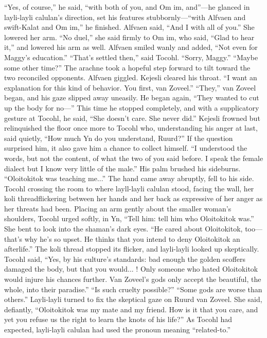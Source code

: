 \documentclass[9pt]{article}
\begin{document}
“Yes, of course,” he said, “with both of you, and Om im, and”—he glanced in layli-layli calulan’s
direction, set his features stubbornly—“with Alfvaen and swift-Kalat and Om im,” he finished.
Alfvaen said, “And I with all of you.” She lowered her arm. “No duel,” she said firmly to Om im,
who said, “Glad to hear it,” and lowered his arm as well. Alfvaen smiled wanly and added, “Not even for
Maggy’s education.”
“That’s settled then,” said Tocohl. “Sorry, Maggy.”
“Maybe some other time?” The arachne took a hopeful step forward to tilt toward the two
reconciled opponents. Alfvaen giggled.
Kejesli cleared his throat. “I want an explanation for this kind of behavior. You first, van Zoveel.”
“They,” van Zoveel began, and his gaze slipped away uneasily. He began again, “They wanted to cut
up the body for no—” This time he stopped completely, and with a supplicatory gesture at Tocohl, he
said, “She doesn’t care. She never did.”
Kejesli frowned but relinquished the floor once more to Tocohl who, understanding his anger at last,
said quietly, “How much Yn do you understand, Ruurd?”
If the question surprised him, it also gave him a chance to collect himself. “I understood the words,
but not the content, of what the two of you said before. I speak the female dialect but I know very little
of the male.” His palm brushed his sideburns. “Oloitokitok was teaching me...” The hand came away
abruptly, fell to his side.
Tocohl crossing the room to where layll-layli calulan stood, facing the wall, her koli threadflickering between her hands and her back as expressive of her anger as her threats had been. Placing an
arm gently about the smaller woman’s shoulders, Tocohl urged softly, in Yn, “Tell him: tell him who
Oloitokitok was.” She bent to look into the shaman’s dark eyes. “He cared about Oloitokitok,
too—that’s why he’s so upset. He thinks that you intend to deny Oloitokitok an afterlife.”
The koli thread stopped its flicker, and layli-layli looked up skeptically. Tocohl said, “Yes, by his
culture’s standards: bad enough the golden scoffers damaged the body, but that you would... ! Only
someone who hated Oloitokitok would injure his chances further. Van Zoveel’s gods only accept the
beautiful, the whole, into their paradise.”
“Is such cruelty possible?”
“Some gods are worse than others.”
Layli-layli turned to fix the skeptical gaze on Ruurd van Zoveel. She said, defiantly, “Oloitokitok
was my mate and my friend. How is it that you care, and yet you refuse us the right to learn the knots of
his life?”
As Tocohl had expected, layli-layli calulan had used the pronoun meaning “related-to.”
\end{document}
